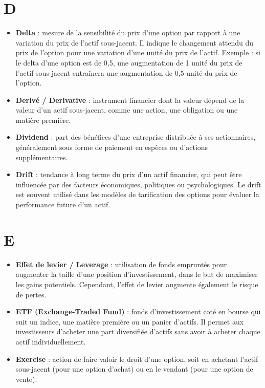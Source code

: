 \documentclass[a4paper,10pt]{article}
\begin{document}
\begin{multicols}{2}
\section*{D}
\begin{itemize}
  \item \textbf{Delta} : mesure de la sensibilité du prix d’une option par rapport à une variation du prix de l’actif sous-jacent. Il indique le changement attendu du prix de l’option pour une variation d’une unité du prix de l’actif. Exemple : si le delta d’une option est de 0,5, une augmentation de 1 unité du prix de l’actif sous-jacent entraînera une augmentation de 0,5 unité du prix de l’option.
  \item \textbf{Derivé / Derivative} : instrument financier dont la valeur dépend de la valeur d’un actif sous-jacent, comme une action, une obligation ou une matière première.
  \item \textbf{Dividend} : part des bénéfices d’une entreprise distribuée à ses actionnaires, généralement sous forme de paiement en espèces ou d’actions supplémentaires.
  \item \textbf{Drift} : tendance à long terme du prix d’un actif financier, qui peut être influencée par des facteurs économiques, politiques ou psychologiques. Le drift est souvent utilisé dans les modèles de tarification des options pour évaluer la performance future d’un actif.
\end{itemize}

\section*{E}
\begin{itemize}
  \item \textbf{Effet de levier / Leverage} : utilisation de fonds empruntés pour augmenter la taille d’une position d’investissement, dans le but de maximiser les gains potentiels. Cependant, l’effet de levier augmente également le risque de pertes.
  \item \textbf{ETF (Exchange-Traded Fund)} : fonds d’investissement coté en bourse qui suit un indice, une matière première ou un panier d’actifs. Il permet aux investisseurs d’acheter une part diversifiée d’actifs sans avoir à acheter chaque actif individuellement.
  \item \textbf{Exercise} : action de faire valoir le droit d’une option, soit en achetant l’actif sous-jacent (pour une option d’achat) ou en le vendant (pour une option de vente).
\end{itemize}


\end{multicols}
\end{document}
